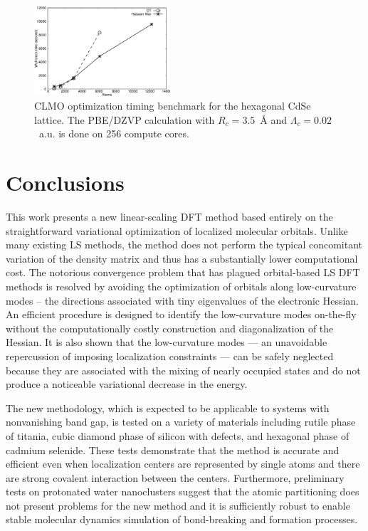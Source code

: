 \documentclass[aps,prl,twocolumn,reprint,amsmath,amssymb]{revtex4-1}
\begin{document}
\begin{figure}
\centering
\includegraphics[width=0.45\textwidth]{timing}
\caption{CLMO optimization timing benchmark for the hexagonal CdSe lattice. The PBE/DZVP calculation with $R_c=3.5$~{\AA} and $\Lambda_c = 0.02$~a.u. is done on 256 compute cores.}
\label{fig:scaling}
\end{figure}


\section{Conclusions} 

This work presents a new linear-scaling DFT method based entirely on the straightforward variational optimization of localized molecular orbitals. 
Unlike many existing LS methods, the method does not perform the typical concomitant variation of the density matrix and thus has a substantially lower computational cost. 
The notorious convergence problem that has plagued orbital-based LS DFT methods is resolved by avoiding the optimization of orbitals along low-curvature modes -- the directions associated with tiny eigenvalues of the electronic Hessian. 
An efficient procedure is designed to identify the low-curvature modes on-the-fly without the computationally costly construction and diagonalization of the Hessian. 
It is also shown that the low-curvature modes --- an unavoidable repercussion of imposing localization constraints --- can be safely neglected because they are associated with the mixing of nearly occupied states and do not produce a noticeable variational decrease in the energy. 

The new methodology, which is expected to be applicable to systems with nonvanishing band gap, is tested on a variety of materials including rutile phase of titania, cubic diamond phase of silicon with defects, and hexagonal phase of cadmium selenide. 
These tests demonstrate that the method is accurate and efficient even when localization centers are represented by single atoms and there are strong covalent interaction between the centers. 
Furthermore, preliminary tests on protonated water nanoclusters suggest that the atomic partitioning does not present problems for the new method and it is sufficiently robust to enable stable molecular dynamics simulation of bond-breaking and formation processes. 
\end{document}
